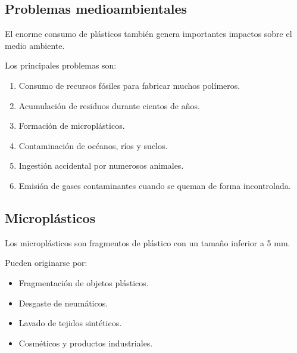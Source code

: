 
\subsection{Problemas medioambientales}

El enorme consumo de plásticos también genera importantes impactos sobre el medio
ambiente.

Los principales problemas son:

\begin{enumerate}

\item Consumo de recursos fósiles para fabricar muchos polímeros.

\item Acumulación de residuos durante cientos de años.

\item Formación de microplásticos.

\item Contaminación de océanos, ríos y suelos.

\item Ingestión accidental por numerosos animales.

\item Emisión de gases contaminantes cuando se queman de forma incontrolada.

\end{enumerate}


\subsection{Microplásticos}

Los microplásticos son fragmentos de plástico con un tamaño inferior a
5 mm.

Pueden originarse por:

\begin{itemize}

\item Fragmentación de objetos plásticos.

\item Desgaste de neumáticos.

\item Lavado de tejidos sintéticos.

\item Cosméticos y productos industriales.

\end{itemize}

